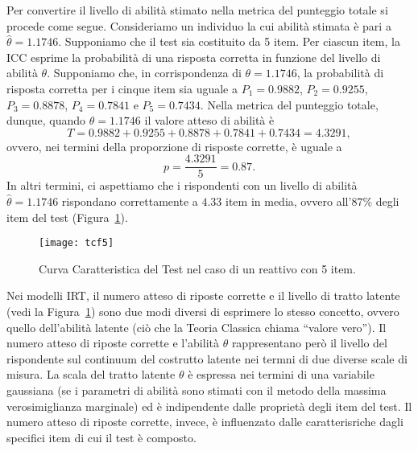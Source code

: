 %

Per convertire il livello di abilità stimato nella metrica del punteggio totale si procede come segue. Consideriamo un individuo la cui abilità stimata è pari a $\hat{\theta} = 1.1746$. Supponiamo che il test sia costituito da 5 item.  Per ciascun item, la ICC esprime la probabilità di una risposta corretta in funzione del livello di abilità $\theta$. Supponiamo che, in corrispondenza di $\theta = 1.1746$, la probabilità di risposta corretta per i cinque item sia uguale a $P_1=0.9882$, $P_2=0.9255$, $P_3=0.8878$, $P_4=0.7841$ e $P_5=0.7434$. Nella metrica del punteggio totale, dunque, quando $\hat{\theta} = 1.1746$ il valore atteso di abilità  è
$$
T=0.9882 + 0.9255 + 0.8878 + 0.7841 + 0.7434 = 4.3291,
$$
ovvero, nei termini della proporzione di risposte corrette, è uguale a
$$
p=\frac{4.3291}{5}= 0.87.
$$
In altri termini, ci aspettiamo che i rispondenti con un livello di abilità $\hat{\theta} = 1.1746$ rispondano correttamente a $4.33$ item in media, ovvero all'$87\%$ degli item del test (Figura~\ref{fig:tcf5}).

\begin{figure}
  \begin{center}
    \texttt{[image: tcf5]}
    \caption{Curva Caratteristica del Test nel caso di un reattivo con 5 item.}
    \label{fig:tcf5}
  \end{center}
\end{figure}



Nei modelli IRT, il numero atteso di riposte corrette e il livello di tratto latente (vedi la Figura~\ref{fig:tcf5}) sono due modi diversi di esprimere lo stesso concetto, ovvero quello dell'abilità latente (ciò che la Teoria Classica chiama ``valore vero'').  Il numero atteso di riposte corrette e l'abilità $\theta$ rappresentano però il livello del rispondente sul continuum del costrutto latente nei termni di due diverse scale di misura. La scala del tratto latente $\theta$ è espressa nei termini di una variabile gaussiana (se i parametri di abilità sono stimati con il metodo della massima verosimiglianza marginale) ed è indipendente dalle proprietà degli item del test.  Il numero atteso di riposte corrette, invece, è influenzato dalle caratterisriche dagli specifici item di cui il test è composto.  

